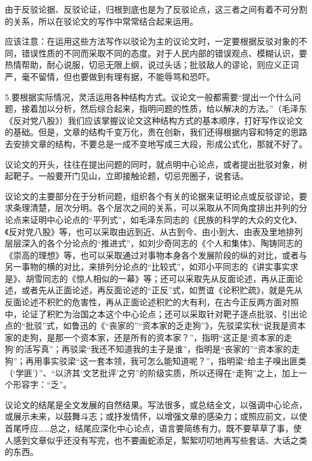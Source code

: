 由于反驳论据、反驳论证，归根到底也是为了反驳论点，这三者之间有着不可分割的关系，所以在驳论文的写作中常常结合起来运用。

应该注意：在运用这些方法写作以驳论为主的议论文时，一定要根据反驳对象的不同，错误性质的不同而采取不同的态度。对于人民内部的错误观点、模糊认识，要热情帮助，耐心说服，切忌无限上纲，说过头话；批驳敌人的谬论，则应义正词严，毫不留情，但也要做到有理有据，不能辱骂和恐吓。

5.要根据实际情况，灵活运用各种结构方式。议论文一般都需要“提出一个什么问题，接着加以分析，然后综合起来，指明问题的性质，给以解决的方法。”（毛泽东《反对党八股》）我们应该掌握议论文这种结构方式的基本顺序，打好写作议论文的基础。但是，文章的结构千变万化，贵在创新，我们还得根据内容和特定的思路去安排文章的结构，不要总是一成不变地写成三大段，形成公式化，那就不好了。

议论文的开头，往往在提出问题的同时，就点明中心论点，或者提出批驳对象，树起靶子。一般要开门见山，立即接触论题，切忌兜圈子，说套话。

议论文的主要部分在于分析问题，组织各个有关的论据来证明论点或反驳谬论，要求条理清楚，层次分明。各个层次之间的关系，可以采取从不同角度排出并列的分论点来证明中心论点的“平列式”，如毛泽东同志的《民族的科学的大众的文化》、《反对党八股》等，也可以采取由远到近、从古到今、由小到大、由表及里地排列层层深入的各个分论点的“推进式”，如刘少奇同志的《个人和集体》、陶铸同志的《崇高的理想》等，也可以采取通过对事物本身各个发展阶段的纵的对比，或者与另一事物的横的对比，来排列分论点的“比较式”，如邓小平同志的《讲实事实求是》、胡雪同志的《惊人相似的一幕》等；还可以采取先从反面论述，再从正面论述，或者先从正面论述，再反面论述的“正反”式，如贾谊《论积贮疏》，就是先从反面论述不积贮的危害性，再从正面论述积贮的大有利，在古今正反两方面对照中，论证了积贮为治国之本这个中心论点；还可以采取针对靶子逐点批驳、引出论点的“批驳”式，如鲁迅的《“丧家的”“资本家的乏走狗”》，先驳梁实秋“说我是资本家的走狗，是那一个资本家，还是所有的资本家？”，指明“这正是‘资本家的走狗’的活写真”；再驳梁“我还不知道我的主子是谁”，指明是“丧家的”“资本家的走狗”；再用事实驳梁“这一套本领，我可怎么能知道呢？”，指明梁“给主子嗅出匪类（‘学匪’）”、“以济其‘文艺批评’之穷”的阶级实质，所以还得在“走狗”之上，加上一个形容字：“乏”。

议论文的结尾是全文发展的自然结果。写法很多，或总结全文，以强调中心论点，或展示未来，以鼓舞斗志；或抒发情怀，以增强文章的感染力；或照应前文，以使首尾呼应……总之，结尾应深化中心论点，语言要简练有力。既不要草草了事，使人感到文章似乎还没有写完，也不要画蛇添足，絮絮叨叨地再写些套话、大话之类的东西。
\newpage
